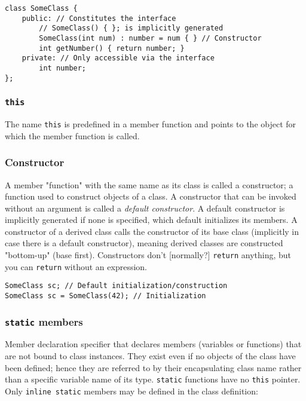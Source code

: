 \documentclass[8pt, table, xcdraw]{article}%
\begin{document}
\begin{lstlisting}
class SomeClass {
    public: // Constitutes the interface
        // SomeClass() { }; is implicitly generated
        SomeClass(int num) : number = num { } // Constructor
        int getNumber() { return number; }
    private: // Only accessible via the interface
        int number;
};
\end{lstlisting}

\subsubsection{\lstinline{this}}

The name \lstinline{this} is predefined in a member function and points to the object for which the member function is called.

\subsubsection{Constructor}
A member "function" with the same name as its class is called a constructor; a function used to construct objects of a class. A constructor that can be invoked without an argument is called a \textit{default constructor}. A default constructor is implicitly generated if none is specified, which default initializes its members. A constructor of a derived class calls the constructor of its base class (implicitly in case there is a default constructor), meaning derived classes are constructed "bottom-up" (base first). Constructors don't [normally?] \lstinline{return} anything, but you can \lstinline{return} without an expression.

\begin{lstlisting}
SomeClass sc; // Default initialization/construction
SomeClass sc = SomeClass(42); // Initialization
\end{lstlisting}

\subsubsection{\lstinline{static} members} \label{staticmembers}

Member declaration specifier that declares members (variables or functions) that are not bound to class instances. They exist even if no objects of the class have been defined; hence they are referred to by their encapsulating class name rather than a specific variable name of its type. \lstinline{static} functions have no \lstinline{this} pointer. Only \lstinline{inline static} members may be defined in the class definition:
\end{document}
